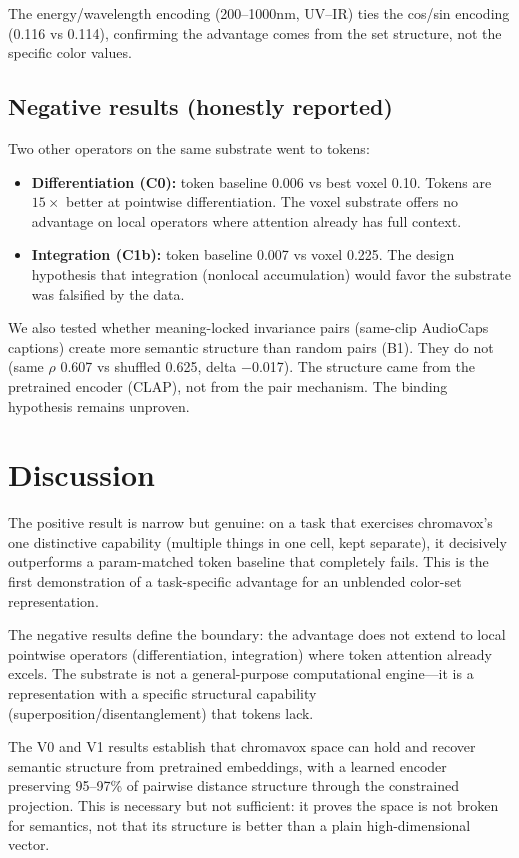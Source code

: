 \documentclass[11pt,a4paper]{article}
\begin{document}
The energy/wavelength encoding (200--1000nm, UV--IR) ties the cos/sin encoding (0.116 vs 0.114), confirming the advantage comes from the set structure, not the specific color values.

\subsection{Negative results (honestly reported)}

Two other operators on the same substrate went to tokens:

\begin{itemize}
\item \textbf{Differentiation (C0):} token baseline 0.006 vs best voxel 0.10. Tokens are $15\times$ better at pointwise differentiation. The voxel substrate offers no advantage on local operators where attention already has full context.
\item \textbf{Integration (C1b):} token baseline 0.007 vs voxel 0.225. The design hypothesis that integration (nonlocal accumulation) would favor the substrate was falsified by the data.
\end{itemize}

We also tested whether meaning-locked invariance pairs (same-clip AudioCaps captions) create more semantic structure than random pairs (B1). They do not (same $\rho$ 0.607 vs shuffled 0.625, delta $-$0.017). The structure came from the pretrained encoder (CLAP), not from the pair mechanism. The binding hypothesis remains unproven.

\section{Discussion}

The positive result is narrow but genuine: on a task that exercises chromavox's one distinctive capability (multiple things in one cell, kept separate), it decisively outperforms a param-matched token baseline that completely fails. This is the first demonstration of a task-specific advantage for an unblended color-set representation.

The negative results define the boundary: the advantage does not extend to local pointwise operators (differentiation, integration) where token attention already excels. The substrate is not a general-purpose computational engine---it is a representation with a specific structural capability (superposition/disentanglement) that tokens lack.

The V0 and V1 results establish that chromavox space can hold and recover semantic structure from pretrained embeddings, with a learned encoder preserving 95--97\% of pairwise distance structure through the constrained projection. This is necessary but not sufficient: it proves the space is not broken for semantics, not that its structure is better than a plain high-dimensional vector.
\end{document}
